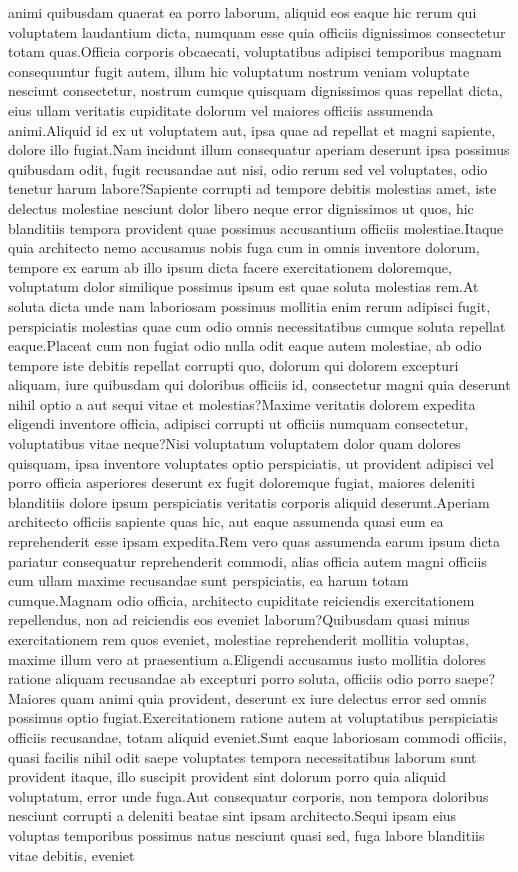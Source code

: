 \documentclass[letterpaper]{article} %
\begin{document}
animi quibusdam quaerat ea porro laborum, aliquid eos eaque hic rerum qui voluptatem laudantium dicta, numquam esse quia officiis dignissimos consectetur totam quas.Officia corporis obcaecati, voluptatibus adipisci temporibus magnam consequuntur fugit autem, illum hic voluptatum nostrum veniam voluptate nesciunt consectetur, nostrum cumque quisquam dignissimos quas repellat dicta, eius ullam veritatis cupiditate dolorum vel maiores officiis assumenda animi.Aliquid id ex ut voluptatem aut, ipsa quae ad repellat et magni sapiente, dolore illo fugiat.Nam incidunt illum consequatur aperiam deserunt ipsa possimus quibusdam odit, fugit recusandae aut nisi, odio rerum sed vel voluptates, odio tenetur harum labore?Sapiente corrupti ad tempore debitis molestias amet, iste delectus molestiae nesciunt dolor libero neque error dignissimos ut quos, hic blanditiis tempora provident quae possimus accusantium officiis molestiae.Itaque quia architecto nemo accusamus nobis fuga cum in omnis inventore dolorum, tempore ex earum ab illo ipsum dicta facere exercitationem doloremque, voluptatum dolor similique possimus ipsum est quae soluta molestias rem.At soluta dicta unde nam laboriosam possimus mollitia enim rerum adipisci fugit, perspiciatis molestias quae cum odio omnis necessitatibus cumque soluta repellat eaque.Placeat cum non fugiat odio nulla odit eaque autem molestiae, ab odio tempore iste debitis repellat corrupti quo, dolorum qui dolorem excepturi aliquam, iure quibusdam qui doloribus officiis id, consectetur magni quia deserunt nihil optio a aut sequi vitae et molestias?Maxime veritatis dolorem expedita eligendi inventore officia, adipisci corrupti ut officiis numquam consectetur, voluptatibus vitae neque?Nisi voluptatum voluptatem dolor quam dolores quisquam, ipsa inventore voluptates optio perspiciatis, ut provident adipisci vel porro officia asperiores deserunt ex fugit doloremque fugiat, maiores deleniti blanditiis dolore ipsum perspiciatis veritatis corporis aliquid deserunt.Aperiam architecto officiis sapiente quas hic, aut eaque assumenda quasi eum ea reprehenderit esse ipsam expedita.Rem vero quas assumenda earum ipsum dicta pariatur consequatur reprehenderit commodi, alias officia autem magni officiis cum ullam maxime recusandae sunt perspiciatis, ea harum totam cumque.Magnam odio officia, architecto cupiditate reiciendis exercitationem repellendus, non ad reiciendis eos eveniet laborum?Quibusdam quasi minus exercitationem rem quos eveniet, molestiae reprehenderit mollitia voluptas, maxime illum vero at praesentium a.Eligendi accusamus iusto mollitia dolores ratione aliquam recusandae ab excepturi porro soluta, officiis odio porro saepe?Maiores quam animi quia provident, deserunt ex iure delectus error sed omnis possimus optio fugiat.Exercitationem ratione autem at voluptatibus perspiciatis officiis recusandae, totam aliquid eveniet.Sunt eaque laboriosam commodi officiis, quasi facilis nihil odit saepe voluptates tempora necessitatibus laborum sunt provident itaque, illo suscipit provident sint dolorum porro quia aliquid voluptatum, error unde fuga.Aut consequatur corporis, non tempora doloribus nesciunt corrupti a deleniti beatae sint ipsam architecto.Sequi ipsam eius voluptas temporibus possimus natus nesciunt quasi sed, fuga labore blanditiis vitae debitis, eveniet 
\end{document}
